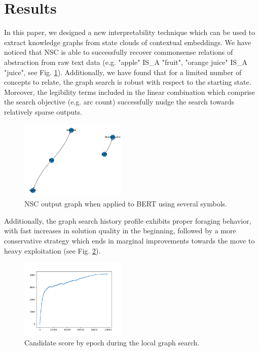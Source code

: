 \section{Results}\label{sec:results}

In this paper, we designed a new interpretability technique which can be used to extract knowledge graphs from state clouds of contextual embeddings. We have noticed that NSC is able to successfully recover commonsense relations of abstraction from raw text data (e.g. "apple" IS\_A "fruit", "orange juice" IS\_A "juice", see Fig. \ref{fig:nsc_output_graph}). Additionally, we have found that for a limited number of concepts to relate, the graph search is robust with respect to the starting state. Moreover, the legibility terms included in the linear combination which comprise the search objective (e.g. arc count) successfully nudge the search towards relatively sparse outputs.

\begin{figure}[h]
    \centering
    \includegraphics[width=0.45\textwidth]{img/distinct graphs.png}
    \caption{NSC output graph when applied to BERT using several symbols.}\label{fig:nsc_output_graph}
\end{figure}

Additionally, the graph search history profile exhibits proper foraging behavior, with fast increases in solution quality in the beginning, followed by a more conservative strategy which ends in marginal improvements towards the move to heavy exploitation (see Fig. \ref{fig:nsc_score_history}).

\begin{figure}[h]
    \centering
    \includegraphics[width=0.45\textwidth]{img/score1.png}
    \caption{Candidate score by epoch during the local graph search.}\label{fig:nsc_score_history}
\end{figure}

